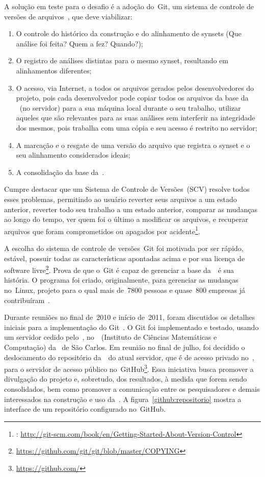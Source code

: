 A solução em teste para o desafio é a adoção do~Git, um sistema de controle de
versões de arquivos~\cite{chacon}, que deve viabilizar:

\begin{enumerate}
  \item O controle do histórico da construção e do alinhamento de synsets (Que
    análise foi feita? Quem a fez? Quando?);
  \item O registro de análises distintas para o mesmo synset, resultando em
    alinhamentos diferentes;
  \item O acesso, via Internet, a todos os arquivos gerados pelos
    desenvolvedores do projeto, pois cada desenvolvedor pode copiar todos os
    arquivos da base da \wnbr\ (no servidor) para a sua máquina local durante o
    seu trabalho, utilizar aqueles que são relevantes para as suas análises sem
    interferir na integridade dos mesmos, pois trabalha com uma cópia e seu
    acesso é restrito no servidor;
  \item A marcação e o resgate de uma versão do arquivo que registra o synset e
    o seu alinhamento considerados ideais;
  \item A consolidação da base da~\wnbr.
\end{enumerate}

Cumpre destacar que um Sistema de Controle de Versões~(SCV) resolve todos esses
problemas, permitindo ao usuário reverter seus arquivos a um estado anterior,
reverter todo seu trabalho a um estado anterior, comparar as mudanças ao longo
do tempo, ver quem foi o último a modificar os arquivos, e recuperar arquivos
que foram comprometidos ou apagados por acidente\footnote{:
\url{http://git-scm.com/book/en/Getting-Started-About-Version-Control}}.

A escolha do sistema de controle de versões~Git foi motivada por ser rápido,
estável, possuir todas as características apontadas acima e por sua licença de
software livre\footnote{\url{https://github.com/git/git/blob/master/COPYING}}.
Prova de que o~Git é capaz de gerenciar a base da~\wnbr\ é sua história. O
programa foi criado, originalmente, para gerenciar as mudanças no~Linux,
projeto para o qual mais de~7800 pessoas e quase~800 empresas já
contribuíram~\cite[p.~1]{corbetetal}.

Durante reuniões no final de~2010 e início de~2011, foram discutidos os
detalhes iniciais para a implementação do Git~\cite[p.~4]{beraldo11}. O Git foi
implementado e testado, usando um servidor cedido pelo~\nilc, no~\icmc\
(Instituto de Ciências Matemáticas e Computação) da \usp\ de São Carlos. Em
reunião no final de julho, foi decidido o deslocamento do repositório da~\wnbr\
do atual servidor, que é de acesso privado no~\nilc, para o servidor de acesso
público no~GitHub\footnote{\url{https://github.com/}}. Essa iniciativa busca
promover a divulgação do projeto e, sobretudo, dos resultados, à medida que
forem sendo consolidados, bem como promover a comunicação entre os
pesquisadores e demais interessados na construção e uso da~\wnbr. A
figura~\ref{github:repositorio} mostra a interface de um repositório
configurado no~GitHub.


